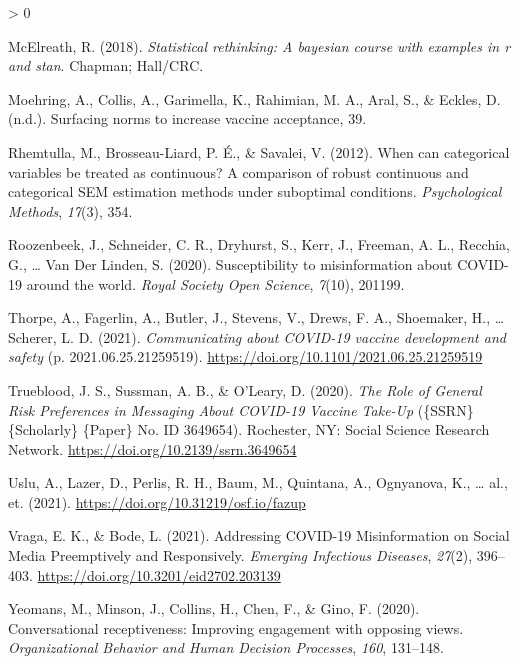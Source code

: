 \documentclass[
  english,
  ,jou,floatsintext]{apa6}
\newlength{\cslhangindent}
\newenvironment{CSLReferences}[2] %
 {%
  \setlength{\parindent}{0pt}
  \ifodd #1 \everypar{\setlength{\hangindent}{\cslhangindent}}\ignorespaces\fi
  \ifnum #2 > 0
  \setlength{\parskip}{#2\baselineskip}
  \fi
 }%
 {}
\begin{document}
\begin{CSLReferences}{1}{0}
\leavevmode\hypertarget{ref-mcelreath2018statistical}{}%
McElreath, R. (2018). \emph{Statistical rethinking: A bayesian course with examples in r and stan}. Chapman; Hall/CRC.

\leavevmode\hypertarget{ref-moehring_surfacing_2021}{}%
Moehring, A., Collis, A., Garimella, K., Rahimian, M. A., Aral, S., \& Eckles, D. (n.d.). Surfacing norms to increase vaccine acceptance, 39.

\leavevmode\hypertarget{ref-rhemtulla2012can}{}%
Rhemtulla, M., Brosseau-Liard, P. É., \& Savalei, V. (2012). When can categorical variables be treated as continuous? A comparison of robust continuous and categorical SEM estimation methods under suboptimal conditions. \emph{Psychological Methods}, \emph{17}(3), 354.

\leavevmode\hypertarget{ref-roozenbeek2020susceptibility}{}%
Roozenbeek, J., Schneider, C. R., Dryhurst, S., Kerr, J., Freeman, A. L., Recchia, G., \ldots{} Van Der Linden, S. (2020). Susceptibility to misinformation about COVID-19 around the world. \emph{Royal Society Open Science}, \emph{7}(10), 201199.

\leavevmode\hypertarget{ref-thorpe_communicating_2021}{}%
Thorpe, A., Fagerlin, A., Butler, J., Stevens, V., Drews, F. A., Shoemaker, H., \ldots{} Scherer, L. D. (2021). \emph{Communicating about {COVID}-19 vaccine development and safety} (p. 2021.06.25.21259519). \url{https://doi.org/10.1101/2021.06.25.21259519}

\leavevmode\hypertarget{ref-trueblood_role_2020}{}%
Trueblood, J. S., Sussman, A. B., \& O'Leary, D. (2020). \emph{The {Role} of {General} {Risk} {Preferences} in {Messaging} {About} {COVID}-19 {Vaccine} {Take}-{Up}} (\{SSRN\} \{Scholarly\} \{Paper\} No. ID 3649654). Rochester, NY: Social Science Research Network. \url{https://doi.org/10.2139/ssrn.3649654}

\leavevmode\hypertarget{ref-uslu2021}{}%
Uslu, A., Lazer, D., Perlis, R. H., Baum, M., Quintana, A., Ognyanova, K., \ldots{} al., et. (2021). \url{https://doi.org/10.31219/osf.io/fazup}

\leavevmode\hypertarget{ref-vraga_addressing_2021}{}%
Vraga, E. K., \& Bode, L. (2021). Addressing {COVID}-19 {Misinformation} on {Social} {Media} {Preemptively} and {Responsively}. \emph{Emerging Infectious Diseases}, \emph{27}(2), 396--403. \url{https://doi.org/10.3201/eid2702.203139}

\leavevmode\hypertarget{ref-yeomans2020conversational}{}%
Yeomans, M., Minson, J., Collins, H., Chen, F., \& Gino, F. (2020). Conversational receptiveness: Improving engagement with opposing views. \emph{Organizational Behavior and Human Decision Processes}, \emph{160}, 131--148.

\end{CSLReferences}
\end{document}
